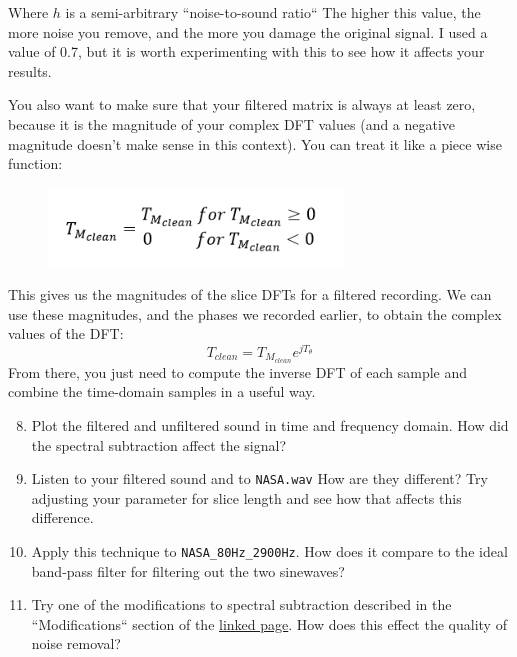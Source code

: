 \documentclass{tufte-handout}
\begin{document}
Where $h$ is a semi-arbitrary ``noise-to-sound ratio`` The higher this value, the more noise you remove, and the more you damage the original signal. I used a value of 0.7, but it is worth experimenting with this to see how it affects your results.

You also want to make sure that your filtered matrix is always at least zero, because it is the magnitude of your complex DFT values (and a negative magnitude doesn't make sense in this context). You can treat it like a piece wise function: \\
\begin{figure}
	\centering 
	\includegraphics[width=0.7\textwidth]{piecewise.png}
	\label{fig:piecewise}
 \end{figure}
This gives us the magnitudes of the slice DFTs for a filtered recording. We can use these magnitudes, and the phases we recorded earlier, to obtain the complex values of the DFT:
\begin{equation}
	T_{clean} = T_{M_{clean}}e^{jT_\theta}
\end{equation}
From there, you just need to compute the inverse DFT of each sample and combine the time-domain samples in a useful way.
\begin{enumerate}
	\setcounter{enumi}{7}
	\item Plot the filtered and unfiltered sound in time and frequency domain. How did the spectral subtraction affect the signal?
	\item Listen to your filtered sound and to \verb|NASA.wav| How are they different? Try adjusting your parameter for slice length and see how that affects this difference.
	\item Apply this technique to \verb|NASA_80Hz_2900Hz|. How does it compare to the ideal band-pass filter for filtering out the two sinewaves?
	\item Try one of the modifications to spectral subtraction described in the ``Modifications`` section of the \href{http://practicalcryptography.com/miscellaneous/machine-learning/tutorial-spectral-subraction/}{linked page}. How does this effect the quality of noise removal?
\end{enumerate}

\end{document}
